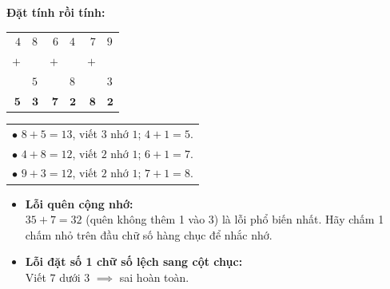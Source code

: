 \documentclass[11pt,a4paper]{article}
\begin{document}
\vspace{-1.5mm}
\noindent
\begin{minipage}[t]{0.49\textwidth}\vspace{0pt}
\begin{tcolorbox}[
  enhanced,
  colback=green!4!white,
  colframe=green!60!black,
  arc=2mm, boxrule=0.8pt,
  left=2mm, right=2mm, top=1.8mm, bottom=1.8mm,
  title={\footnotesize\bfseries\color{white}\faCheckCircle\ 4. Ví dụ thực hành chuẩn mực}
]
{\footnotesize
\textbf{Đặt tính rồi tính:}\\
\begin{tabular}{r@{\,}lr@{\,}lr@{\,}l}
  $4$ & $8$ & $6$ & $4$ & $7$ & $9$ \\
$+$ & & $+$ & & $+$ & \\
    & $5$ & & $8$ & & $3$ \\ \hline
  $\mathbf{5}$ & $\mathbf{3}$ & $\mathbf{7}$ & $\mathbf{2}$ & $\mathbf{8}$ & $\mathbf{2}$
\end{tabular}
\quad
\begin{tabular}{l}
  $\bullet$ $8+5=13$, viết $3$ nhớ $1$; $4+1=5$.\\
  $\bullet$ $4+8=12$, viết $2$ nhớ $1$; $6+1=7$.\\
  $\bullet$ $9+3=12$, viết $2$ nhớ $1$; $7+1=8$.
\end{tabular}
}
\end{tcolorbox}
\end{minipage}
\hfill
\begin{minipage}[t]{0.49\textwidth}\vspace{0pt}
\begin{tcolorbox}[
  enhanced,
  colback=red!4!white,
  colframe=red!75!black,
  arc=2mm, boxrule=0.8pt,
  left=2mm, right=2mm, top=1.8mm, bottom=1.8mm,
  title={\footnotesize\bfseries\color{white}\faExclamationTriangle\ 5. Mẹo tránh bẫy trắc nghiệm}
]
{\footnotesize
\begin{itemize}\setlength{\itemsep}{1pt}\setlength{\leftskip}{-2.5mm}
  \item \textbf{Lỗi quên cộng nhớ:}\\
  $35 + 7 = 32$ (quên không thêm 1 vào 3) là lỗi phổ biến nhất. Hãy chấm 1 chấm nhỏ trên đầu chữ số hàng chục để nhắc nhớ.
  \item \textbf{Lỗi đặt số 1 chữ số lệch sang cột chục:}\\
  Viết $7$ dưới $3$ $\implies$ sai hoàn toàn.
\end{itemize}
}
\end{tcolorbox}
\end{minipage}
\end{document}
